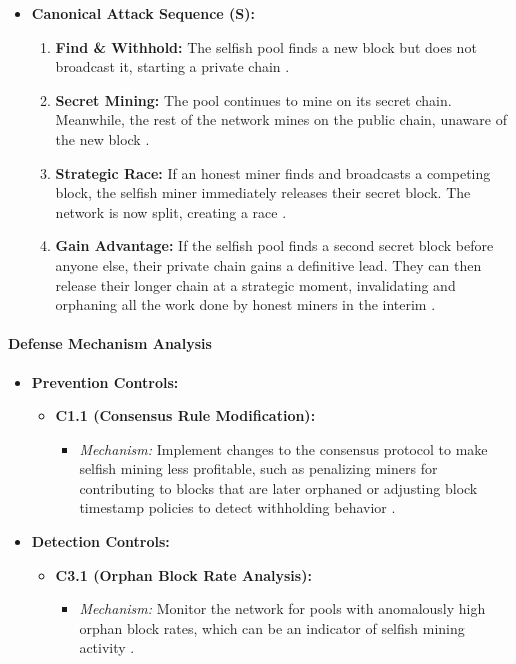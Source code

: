 \begin{itemize}
    \item \textbf{Canonical Attack Sequence (S):}
    \begin{enumerate}
        \item \textbf{Find \& Withhold:} The selfish pool finds a new block but does not broadcast it, starting a private chain \cite{eyal2014}.
        \item \textbf{Secret Mining:} The pool continues to mine on its secret chain. Meanwhile, the rest of the network mines on the public chain, unaware of the new block \cite{eyal2014}.
        \item \textbf{Strategic Race:} If an honest miner finds and broadcasts a competing block, the selfish miner immediately releases their secret block. The network is now split, creating a race \cite{eyal2014, wang2019}.
        \item \textbf{Gain Advantage:} If the selfish pool finds a second secret block before anyone else, their private chain gains a definitive lead. They can then release their longer chain at a strategic moment, invalidating and orphaning all the work done by honest miners in the interim \cite{eyal2014}.
    \end{enumerate}
\end{itemize}

\paragraph{Defense Mechanism Analysis}

\begin{itemize}
    \item \textbf{Prevention Controls:}
    \begin{itemize}
        \item \textbf{C1.1 (Consensus Rule Modification):}
            \begin{itemize}
                \item \textit{Mechanism:} Implement changes to the consensus protocol to make selfish mining less profitable, such as penalizing miners for contributing to blocks that are later orphaned or adjusting block timestamp policies to detect withholding behavior \cite{eyal2014, wang2019}.
            \end{itemize}
    \end{itemize}
    \item \textbf{Detection Controls:}
    \begin{itemize}
        \item \textbf{C3.1 (Orphan Block Rate Analysis):}
            \begin{itemize}
                \item \textit{Mechanism:} Monitor the network for pools with anomalously high orphan block rates, which can be an indicator of selfish mining activity \cite{wang2019}.
            \end{itemize}
    \end{itemize}
\end{itemize}


